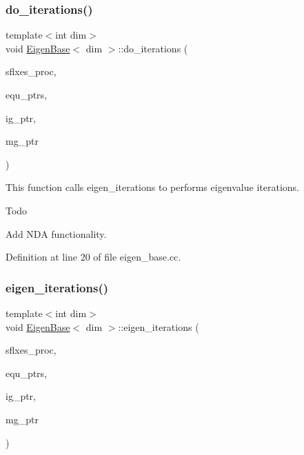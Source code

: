 \subsubsection{\texorpdfstring{do\+\_\+iterations()}{do\_iterations()}}
{\footnotesize\ttfamily template$<$int dim$>$ \\
void \hyperlink{class_eigen_base}{Eigen\+Base}$<$ dim $>$\+::do\+\_\+iterations (\begin{DoxyParamCaption}\item[{std\+::vector$<$ Vector$<$ double $>$ $>$ \&}]{sflxes\+\_\+proc,  }\item[{std\+::vector$<$ std\+\_\+cxx11\+::shared\+\_\+ptr$<$ \hyperlink{class_equation_base}{Equation\+Base}$<$ dim $>$ $>$ $>$ \&}]{equ\+\_\+ptrs,  }\item[{std\+\_\+cxx11\+::shared\+\_\+ptr$<$ \hyperlink{class_i_g_base}{I\+G\+Base}$<$ dim $>$ $>$}]{ig\+\_\+ptr,  }\item[{std\+\_\+cxx11\+::shared\+\_\+ptr$<$ \hyperlink{class_m_g_base}{M\+G\+Base}$<$ dim $>$ $>$}]{mg\+\_\+ptr }\end{DoxyParamCaption})\hspace{0.3cm}{\ttfamily [virtual]}}

This function calls eigen\+\_\+iterations to performs eigenvalue iterations.

\begin{DoxyRefDesc}{Todo}
\item[\hyperlink{todo__todo000002}{Todo}]Add N\+DA functionality. \end{DoxyRefDesc}


Definition at line 20 of file eigen\+\_\+base.\+cc.

\mbox{\label{class_eigen_base_ae09830ed4bcb14b7b699cd5f5460fab7}} 
\subsubsection{\texorpdfstring{eigen\+\_\+iterations()}{eigen\_iterations()}}
{\footnotesize\ttfamily template$<$int dim$>$ \\
void \hyperlink{class_eigen_base}{Eigen\+Base}$<$ dim $>$\+::eigen\+\_\+iterations (\begin{DoxyParamCaption}\item[{std\+::vector$<$ Vector$<$ double $>$ $>$ \&}]{sflxes\+\_\+proc,  }\item[{std\+::vector$<$ std\+\_\+cxx11\+::shared\+\_\+ptr$<$ \hyperlink{class_equation_base}{Equation\+Base}$<$ dim $>$ $>$ $>$ \&}]{equ\+\_\+ptrs,  }\item[{std\+\_\+cxx11\+::shared\+\_\+ptr$<$ \hyperlink{class_i_g_base}{I\+G\+Base}$<$ dim $>$ $>$}]{ig\+\_\+ptr,  }\item[{std\+\_\+cxx11\+::shared\+\_\+ptr$<$ \hyperlink{class_m_g_base}{M\+G\+Base}$<$ dim $>$ $>$}]{mg\+\_\+ptr }\end{DoxyParamCaption})\hspace{0.3cm}{\ttfamily [virtual]}}

